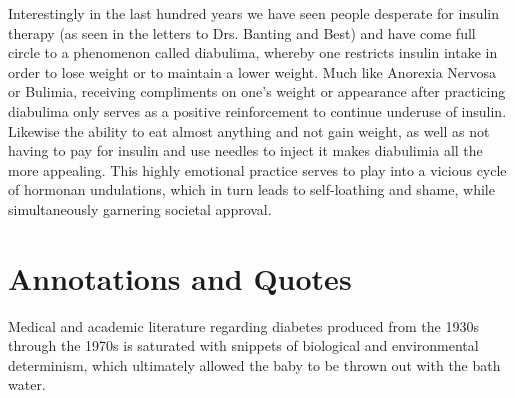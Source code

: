 \documentclass[12pt]{article}
\begin{document}
Interestingly in the last hundred years we have seen people desperate for insulin therapy (as seen in the letters to Drs. Banting and Best) and have come full circle to a phenomenon called diabulima, whereby one restricts insulin intake in order to lose weight or to maintain a lower weight. Much like Anorexia Nervosa or Bulimia, receiving compliments on one's weight or appearance after practicing diabulima only serves as a positive reinforcement to continue underuse of insulin. Likewise the ability to eat almost anything and not gain weight, as well as not having to pay for insulin and use needles to inject it makes diabulimia all the more appealing. This highly emotional practice serves to play into a vicious cycle of hormonan undulations, which in turn leads to self-loathing and shame, while simultaneously garnering societal approval. 


 

\section{Annotations and Quotes}

Medical and academic literature regarding diabetes produced from the 1930s through the 1970s is saturated with snippets of biological and environmental determinism, which ultimately allowed the baby to be thrown out with the bath water.  
\end{document}
